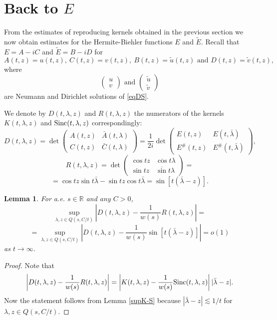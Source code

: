\documentclass[11pt,twoside,reqno]{amsart}
\def\ti{\tilde}
\def\to{\rightarrow}
\def\R{{\mathbb R}}
\def\l{\lambda}
\def\S{\text{\rm Sinc}}
\theoremstyle{plain}
\newtheorem{lemma}{Lemma}
\numberwithin{equation}{section}
\begin{document}
\section{Back to $E$}\label{secE}



From the estimates of reproducing kernels obtained in the previous section we now obtain estimates
for the Hermite-Biehler functions $E$ and $\ti E$. Recall that $E=A-iC$ and $\ti E=B-iD$ for
$$A(t,z)=u(t,z),\ C(t,z)=v(t,z),\ B(t,z)=\ti u(t,z)\textrm{ and }D(t,z)=\ti v(t,z),$$
where
$$\begin{pmatrix}u \\ v
\end{pmatrix}\textrm{ and }\begin{pmatrix}\ti u \\ \ti v
\end{pmatrix}
$$
are Neumann and Dirichlet solutions of \eqref{eqDS}.

We denote by $D(t,\l,z)$ and $R(t,\l,z)$ the numerators of the kernels $K(t,\l,z)$ and $\S(t,\l,z)$ correspondingly:
\begin{equation}
D(t,\l,z)=\det\begin{pmatrix}A(t,z) & \bar A(t,\l) \\ C(t,z) & \bar C (t,\l)
\end{pmatrix}=\frac 1{2i}\det\begin{pmatrix}E(t,z) & E(t,\bar \l) \\ E^\#(t,z) & E^\# (t,\bar \l)
\end{pmatrix},\label{eq1004}\end{equation}
$$
R(t,\l,z)=\det\begin{pmatrix} \cos tz & \overline \cos t\l \\ \sin tz & \overline \sin t\l
\end{pmatrix}=$$$$=\cos tz \sin t\bar \l - \sin tz \cos t\bar \l =\sin [t(\bar \l -z)].
$$

\begin{lemma}\label{lm500}
For a.e. $s\in \R$ and any $C>0$,
\begin{equation}
\sup_{\l,z\in Q(s,C/t)}\left|D(t,\l,z)-\frac{1}{w(s)}R(t,\l,z)\right|=\label{eqDet0}
\end{equation}
$$=\sup_{\l,z\in Q(s,C/t)}\left|D(t,\l,z)-\frac{1}{w(s)}\sin [t(\bar \l -z)]\right|=o(1)
$$
as $t\to\infty$.
\end{lemma}


\begin{proof}
Note that
$$\left|D(t,\l,z)-\frac{1}{w(s)}R(t,\l,z)\right|=\left|K(t,\l,z)-\frac{1}{w(s)}\S(t, \l,z)\right||\bar \l-z|.
$$
Now the statement follows from Lemma \ref{supK-S} because $|\bar \l-z|\lesssim 1/t$ for $\l,z\in Q(s,C/t)$.

\end{proof}
\end{document}
